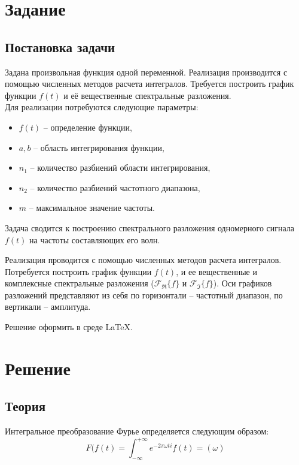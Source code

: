 \documentclass[a4paper, 14pt, titlepage, fleqn]{extarticle}
\begin{document}
	\begin{specialx}
	\section{Задание}
		\subsection{Постановка задачи}

			Задана произвольная функция одной переменной. Реализация производится с помощью численных методов расчета интегралов. Требуется построить график функции  \(f(t)\) и её вещественные спектральные разложения.\\Для реализации потребуются следующие параметры:

			\begin{itemize}
				\item \(f(t)\) -- определение функции,
				\item \(a,b\) -- область интегрирования функции,
				\item \(n_1\) -- количество разбиений области интегрирования,
				\item \(n_2	\) -- количество разбиений частотного диапазона,
				\item \(m\) -- максимальное значение частоты.
			\end{itemize}

			Задача сводится к построению спектрального разложения одномерного сигнала \(f(t)\) на частоты составляющих его волн.

                Реализация проводится с помощью численных методов расчета
            интегралов. Потребуется построить график функции \(f(t)\), и ее вещественные и комплексные спектральные разложения (\(\mathscr{F_{\Re}}\{f\}\) и \(\mathscr{F_{\Im}}\{f\}\)).
			Оси графиков
			разложений представляют из себя по горизонтали -- частотный диапазон, по вертикали -- амплитуда.

			Решение оформить в среде \LaTeX.

	\section{Решение}
            \subsection{Теория}
			Интегральное преобразование Фурье определяется следующим образом:\\
				$$F(f(t)=\int_{-\infty}^{+\infty}{e^{-2\pi \omega t i }}f\left(t \right)= (\omega )$$


\end{specialx}
\end{document}
